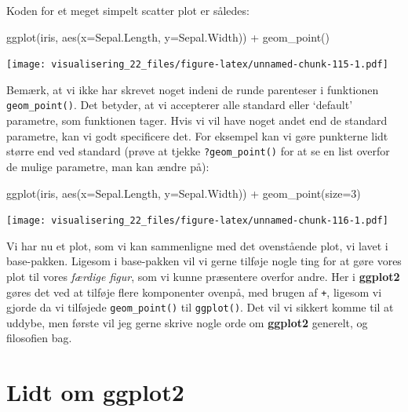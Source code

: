 \documentclass[
]{book}
\newenvironment{Shaded}{\begin{snugshade}}{\end{snugshade}}
\newcommand{\AttributeTok}[1]{\textcolor[rgb]{0.77,0.63,0.00}{#1}}
\newcommand{\DecValTok}[1]{\textcolor[rgb]{0.00,0.00,0.81}{#1}}
\newcommand{\FunctionTok}[1]{\textcolor[rgb]{0.00,0.00,0.00}{#1}}
\newcommand{\NormalTok}[1]{#1}
\newcommand{\SpecialCharTok}[1]{\textcolor[rgb]{0.00,0.00,0.00}{#1}}
\begin{document}
Koden for et meget simpelt scatter plot er således:

\begin{Shaded}
\begin{Highlighting}[]
\FunctionTok{ggplot}\NormalTok{(iris, }\FunctionTok{aes}\NormalTok{(}\AttributeTok{x=}\NormalTok{Sepal.Length, }\AttributeTok{y=}\NormalTok{Sepal.Width)) }\SpecialCharTok{+}
  \FunctionTok{geom\_point}\NormalTok{()}
\end{Highlighting}
\end{Shaded}

\texttt{[image: visualisering\_22\_files/figure-latex/unnamed-chunk-115-1.pdf]}

Bemærk, at vi ikke har skrevet noget indeni de runde parenteser i funktionen \texttt{geom\_point()}. Det betyder, at vi accepterer alle standard eller `default' parametre, som funktionen tager. Hvis vi vil have noget andet end de standard parametre, kan vi godt specificere det. For eksempel kan vi gøre punkterne lidt større end ved standard (prøve at tjekke \texttt{?geom\_point()} for at se en list overfor de mulige parametre, man kan ændre på):

\begin{Shaded}
\begin{Highlighting}[]
\FunctionTok{ggplot}\NormalTok{(iris, }\FunctionTok{aes}\NormalTok{(}\AttributeTok{x=}\NormalTok{Sepal.Length, }\AttributeTok{y=}\NormalTok{Sepal.Width)) }\SpecialCharTok{+}
  \FunctionTok{geom\_point}\NormalTok{(}\AttributeTok{size=}\DecValTok{3}\NormalTok{)}
\end{Highlighting}
\end{Shaded}

\texttt{[image: visualisering\_22\_files/figure-latex/unnamed-chunk-116-1.pdf]}

Vi har nu et plot, som vi kan sammenligne med det ovenstående plot, vi lavet i base-pakken. Ligesom i base-pakken vil vi gerne tilføje nogle ting for at gøre vores plot til vores \emph{færdige figur}, som vi kunne præsentere overfor andre. Her i \textbf{ggplot2} gøres det ved at tilføje flere komponenter ovenpå, med brugen af \texttt{+}, ligesom vi gjorde da vi tilføjede \texttt{geom\_point()} til \texttt{ggplot()}. Det vil vi sikkert komme til at uddybe, men første vil jeg gerne skrive nogle orde om \textbf{ggplot2} generelt, og filosofien bag.

\hypertarget{lidt-om-ggplot2}{%
\section{Lidt om ggplot2}\label{lidt-om-ggplot2}}
\end{document}

